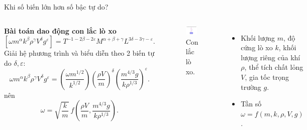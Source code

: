 \begin{frame}{Khi số biến lớn hơn số bậc tự do?}
\begin{columns}
    \textbf{Bài toán dao động con lắc lò xo \cite{Lemons_2017}}
    \begin{equation}
        \left[ \omega m^\alpha k^\beta \rho^\gamma V^\delta g^\varepsilon \right]
        = T^{-1 - 2 \beta - 2 \varepsilon} M^{\alpha + \beta + \gamma} L^{3 \delta - 3 \gamma - \varepsilon}.
    \end{equation}
    Giải hệ phương trình và biểu diễn theo 2 biến tự do \(\delta, \varepsilon\):
    \begin{equation}
        \omega m^\alpha k^\beta \rho^\gamma V^\delta g^\varepsilon = \left( \frac{\omega m^{1/2}}{k^{1/2}} \right) \left( \frac{\rho V}{m} \right)^\delta \left( \frac{m^{4/3} g}{k \rho^{1/3}}\right)^\varepsilon.
    \end{equation}
    nên
    \begin{equation}
        \omega = \sqrt{\frac{k}{m}} \ f\left( \frac{\rho V}{m}, \frac{m^{4/3} g}{k \rho^{1/3}} \right).
    \end{equation}

    \vspace{-8mm}
    \begin{figure}
        \centering
        \includegraphics[width=0.9\textwidth]{Figures/Pendulum.pdf}
        \caption{Con lắc lò xo.}
    \end{figure}
    \vspace{-5mm}
    \begin{itemize}
        \item Khối lượng \(m\), độ cứng lò xo \(k\), khối lượng riêng của khí \(\rho\), thể tích chất lỏng \(V\), gia tốc trọng trường \(g\).
        \item Tần số \(\omega = f(m, k, \rho, V, g)\).
    \end{itemize}
\end{columns}
\end{frame}



